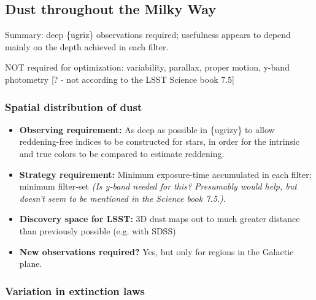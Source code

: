 \subsection{Dust throughout the Milky Way}

Summary: deep \{ugriz\} observations required; usefulness appears to depend mainly on the depth achieved in each filter. 

NOT required for optimization: variability, parallax, proper motion,
y-band photometry [? - not according to the LSST Science book 7.5]

\subsubsection{Spatial distribution of dust}

\begin{itemize}
\item {\bf Observing requirement:} As deep as possible in \{ugrizy\} to allow reddening-free indices to be constructed for stars, in order for the intrinsic and true colors to be compared to estimate reddening.
\vspace{-2mm}

\item {\bf Strategy requirement:} Minimum exposure-time accumulated in each filter; minimum filter-set {\it (Is y-band needed for this? Presumably would help, but doesn't seem to be mentioned in the Science book 7.5.)}.
\vspace{-2mm}

\item {\bf Discovery space for LSST:} 3D dust maps out to much greater distance than previously possible (e.g. with SDSS)
\vspace{-2mm}

\item {\bf New observations required?} Yes, but only for regions in the Galactic plane. 
\vspace{-2mm}
\end{itemize}


\subsubsection{Variation in extinction laws}

